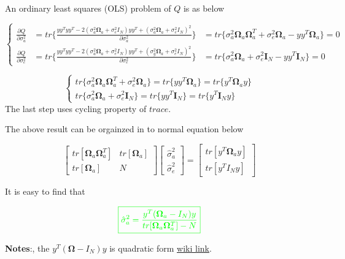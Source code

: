 \documentclass[]{article}
\begin{document}
An ordinary least squares (OLS) problem of \(Q\) is as below

\[
\left\{
 \begin{array}{lll}
  \frac{\partial{Q}}{\partial{\sigma^2_a}} & =tr\{\frac{yy^Tyy^T-2(\sigma^2_a\mathbf{\Omega}_a+\sigma^2_eI_N)yy^T+(\sigma^2_a\mathbf{\Omega}_a+\sigma^2_eI_N)^2}{\partial{\sigma^2_a}}\}&=tr\{\sigma^2_a\mathbf{\Omega}_a\mathbf{\Omega}_a^T+\sigma^2_e\mathbf{\Omega}_a-yy^T\mathbf{\Omega}_a\}=0\\
  \frac{\partial{Q}}{\partial{\sigma^2_e}} & =tr\{\frac{yy^Tyy^T-2(\sigma^2_a\mathbf{\Omega}_a+\sigma^2_eI_N)yy^T+(\sigma^2_g\mathbf{\Omega}_a+\sigma^2_eI_N)^2}{\partial{\sigma^2_e}}\}&=tr\{\sigma^2_a\mathbf{\Omega}_a+\sigma^2_e\mathbf{I}_N-yy^T\mathbf{I}_N\}=0
 \end{array}
\right.
\]

\[
\left\{
 \begin{array}{lll}
tr\{\sigma^2_a\mathbf{\Omega}_a\mathbf{\Omega}_a^T+\sigma^2_e\mathbf{\Omega}_a\}=tr\{yy^T\mathbf{\Omega}_a\}=tr\{y^T\mathbf{\Omega}_ay\}\\
tr\{\sigma^2_a\mathbf{\Omega}_a+\sigma^2_e\mathbf{I}_N\}=tr\{yy^T\mathbf{I}_N\}=tr\{y^T\mathbf{I}_Ny\}
 \end{array}
\right.
\] The last step uses cycling property of
\href{https://en.wikipedia.org/wiki/Trace_(linear_algebra)}{\(trace\)}.

The above result can be orgainzed in to normal equation below

\[
\begin{bmatrix} tr[\mathbf{\Omega}_a\mathbf{\Omega}_a^T] & tr[\mathbf{\Omega}_a] \\ tr[\mathbf{\Omega}_a] & N \end{bmatrix} \left[ \begin{array}{c} \hat{\sigma}^2_a \\ \hat{\sigma}^2_e \end{array} \right] = \left[ \begin{array}{c} tr[y^T\mathbf{\Omega}_ay] \\ tr[y^TI_Ny] \end{array} \right] 
\]

It is easy to find that

\[\color{green}{\boxed{\hat{\sigma}^2_a=\frac{y^T(\mathbf{\Omega}_a-I_N)y}{tr[\mathbf{\Omega}_a\mathbf{\Omega}_a^T]-N}}}\]

\textbf{Notes}:, the \(y^T(\mathbf{\Omega}-I_N)y\) is quadratic form
\href{https://en.wikipedia.org/wiki/Quadratic_form_(statistics)}{wiki
link}.
\end{document}
